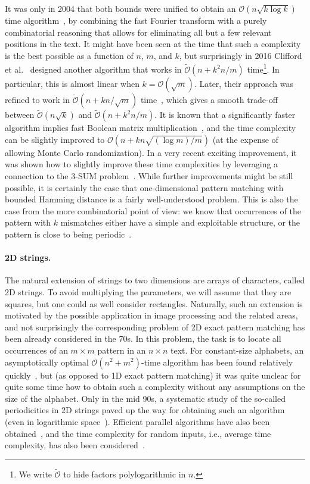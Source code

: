 \documentclass[twoside,leqno]{article}
\renewcommand{\O}{\mathcal{O}}
\newcommand{\tO}{\tilde{\mathcal{O}}}
\begin{document}
It was only in 2004 that both bounds were unified to obtain an $\O(n\sqrt{k \log k})$ time algorithm~\cite{Amir2004},
by combining the fast Fourier transform with a purely combinatorial reasoning that allows for eliminating all but a few relevant positions
in the text. It might have been seen at the time that such a complexity is the best possible as a function of $n$, $m$, and $k$,
but surprisingly in 2016 Clifford et al.~\cite{Clifford2016a} designed another algorithm that works
in $\tO(n + k^2n/m)$ time\footnote{We write $\tO$ to hide factors polylogarithmic in $n$.}. In particular, this is almost linear when $k=\O(\sqrt{m})$. Later, their
approach was refined to work in $\tO(n + kn/\sqrt{m})$ time~\cite{Gawrychowski2018},
which gives a smooth trade-off between $\tO(n\sqrt{k})$ and $\tO(n + k^2n/m)$. 
It is known that a significantly faster algorithm implies fast Boolean matrix multiplication~\cite{Gawrychowski2018},
and the time complexity can be slightly improved to $\O(n + kn\sqrt{(\log m) / m})$ \cite{Chan2020} (at the expense
of allowing Monte Carlo randomization). In a very recent exciting improvement, it was shown how to slightly improve
these time complexities by leveraging a connection to the 3-SUM problem~\cite{Chan0WX23}.
While further improvements might be still possible, it is certainly the case that one-dimensional pattern matching with
bounded Hamming distance is a fairly well-understood problem.
This is also the case from the more combinatorial point of view: we know that occurrences of the pattern with $k$ mismatches
either have a simple and exploitable structure, or the pattern is close to being periodic~\cite{Bringmann2019,Charalampopoulos2020a}.

\paragraph{2D strings.} The natural extension of strings to two dimensions are arrays of characters, called 2D strings. 
To avoid multiplying the parameters, we will assume that they are squares, but one could as well consider rectangles.
Naturally, such an extension is motivated by the possible application in image processing and the related areas,
and not surprisingly the corresponding problem of 2D exact pattern matching has been already considered in the 70s.
In this problem, the task is to locate all occurrences of an $m\times m$ pattern in an $n\times n$ text.
For constant-size alphabets, an asymptotically optimal $\O(n^{2}+m^{2})$-time algorithm has been found relatively
quickly~\cite{AMIR1992233,AMIR19922,BIRD1977168,doi:10.1137/0207043}, but (as opposed to 1D exact pattern matching) it was quite unclear for quite some time how to obtain
such a complexity without any assumptions on the size of the alphabet. Only in the mid 90s, a systematic
study of the so-called periodicities in 2D strings paved up the way for obtaining such an algorithm~\cite{Amir1994,Galil1996}
(even in logarithmic space~\cite{Crochemore1995}). Efficient parallel algorithms have also been obtained~\cite{Crochemore1998},
and the time complexity for random inputs, i.e., average time complexity, has also been considered~\cite{Baeza-Yates1993,Tarhio1996,Kaerkkaeinen1999}.
\end{document}
